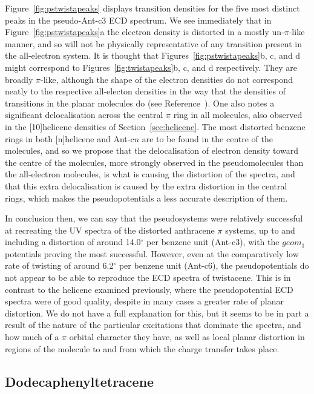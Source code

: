 \documentclass[aip,reprint,nofootinbib]{revtex4-1}
\begin{document}
Figure~\ref{fig:pstwistapeaks} displays transition densities for the five most distinct peaks in the pseudo-Ant-c3 ECD spectrum. We see immediately that in Figure~\ref{fig:pstwistapeaks}a the electron density is distorted in a mostly un-$\pi$-like manner, and so will not be physically representative of any transition present in the all-electron system. It is thought that Figures~\ref{fig:pstwistapeaks}b, c, and d might correspond to Figures~\ref{fig:twistapeaks}b, c, and d respectively. They are broadly $\pi$-like, although the shape of the electron densities do not correspond neatly to the respective all-electon densities in the way that the densities of transitions in the planar molecules do (see Reference~\cite{punter2019atomic}). One also notes a significant delocalisation across the central $\pi$ ring in all molecules, also observed in the [10]helicene densities of Section~\ref{sec:helicene}. The most distorted benzene rings in both [n]helicene and Ant-c$n$ are to be found in the centre of the molecules, and so we propose that the delocalisation of electron density toward the centre of the molecules, more strongly observed in the pseudomolecules than the all-electron molecules, is what is causing the distortion of the spectra, and that this extra delocalisation is caused by the extra distortion in the central rings, which makes the pseudopotentials a less accurate description of them.

In conclusion then, we can say that the pseudosystems were relatively successful at recreating the UV spectra of the distorted anthracene $\pi$ systems, up to and including a distortion of around 14.0$^{\circ}$ per benzene unit (Ant-c3), with the $geom_1$ potentials proving the most successful. However, even at the comparatively low rate of twisting of around 6.2$^{\circ}$ per benzene unit (Ant-c6), the pseudopotentials do not appear to be able to reproduce the ECD spectra of twistacene. This is in contrast to the helicene examined previously, where the pseudopotential ECD spectra were of good quality, despite in many cases a greater rate of planar distortion. We do not have a full explanation for this, but it seems to be in part a result of the nature of the particular excitations that dominate the spectra, and how much of a $\pi$ orbital character they have, as well as local planar distortion in regions of the molecule to and from which the charge transfer takes place.

\subsection{Dodecaphenyltetracene}
\label{sec:dodecaphenyltetracene}
\end{document}
